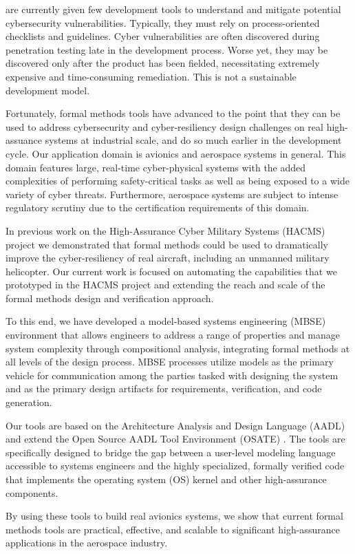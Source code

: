  are currently given few
development tools to understand and mitigate 
potential cybersecurity vulnerabilities.  Typically, they must rely on
process-oriented checklists and guidelines. Cyber vulnerabilities
are often discovered during penetration testing late in the
development process. Worse yet, they may be discovered
only after the product has been fielded, necessitating extremely
expensive and time-consuming remediation. This is not a
sustainable development model.

Fortunately, formal methods tools have advanced to the point that they can 
be used to address cybersecurity and cyber-resiliency design challenges
on real high-assuance systems at industrial scale, and do so much earlier in
the development cycle.  Our application domain is avionics and aerospace systems in general.  
This domain features large, real-time cyber-physical systems with the added 
complexities of performing safety-critical tasks as well as being exposed to 
a wide variety of cyber threats.  Furthermore, aerospace systems are subject 
to intense regulatory scrutiny due to the certification requirements of this domain. 

In previous work on the High-Assurance Cyber Military Systems (HACMS) project \cite{HACMS}
we demonstrated that formal methods could be used to dramatically improve the 
cyber-resiliency of real aircraft, including an unmanned military helicopter.  Our current
work is focused on automating the capabilities that we prototyped in the HACMS project
and extending the reach and scale of the formal methods design and verification approach.  

To this end, we have developed a model-based systems engineering (MBSE) 
environment that allows engineers to address a range of properties and 
manage system complexity through compositional analysis, integrating formal methods
at all levels of the design process.  MBSE processes utilize models as the primary vehicle for 
communication among the parties tasked with designing the system and as the primary 
design artifacts for requirements, verification, and code generation.  

Our tools are based on the 
Architecture Analysis and Design Language (AADL) and extend the Open Source
AADL Tool Environment (OSATE) \cite{OSATE}.  The tools are specifically designed 
to bridge the gap between a user-level modeling language accessible to systems 
engineers and the highly specialized, formally verified code that implements the operating system (OS)
kernel and other high-assurance components.   

By using these tools to build real avionics systems, we show 
that current formal methods tools are practical, effective, and scalable to significant 
high-assurance applications in the aerospace industry.  
